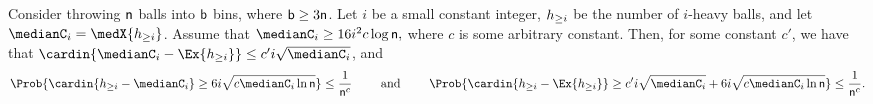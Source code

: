 \begin{lemma}
    Consider throwing $\mathsf{n}$ balls into $\mathsf{b}$ bins, where
    $\mathsf{b} \geq 3 \mathsf{n}$. Let $i$ be a small constant integer,
    $h_{\geq i}$ be the number of $i$-heavy balls, and let
    $\medianC_i = \medX{\NHX{i}}$.  Assume that
    \begin{math}
        \medianC_i \geq 16i^2 c \log \nballs,
    \end{math}
    where $c$ is some arbitrary constant.  Then, for some constant
    $c'$, we have that
    $\cardin{\medianC_i - \Ex{\NHX{i}}} \leq c' i \sqrt{\medianC_i}$,
    and
    \begin{equation*}
        \Prob{ \cardin{\NHX{i} - \medianC_i } \geq 6i \sqrt{c
              \medianC_i \ln \nballs}} \leq %
        \frac{1}{\nballs^{c}}%
        \qquad\text{ and }\qquad%
        \Prob{ \cardin{\bigl.\NHX{i}
              - \Ex{\NHX{i}} } \geq c'i \sqrt{\medianC_i} + 6i \sqrt{c
              \medianC_i \ln \nballs}} \leq %
        \frac{1}{\nballs^{c}}.
  \end{equation*}
\end{lemma}
